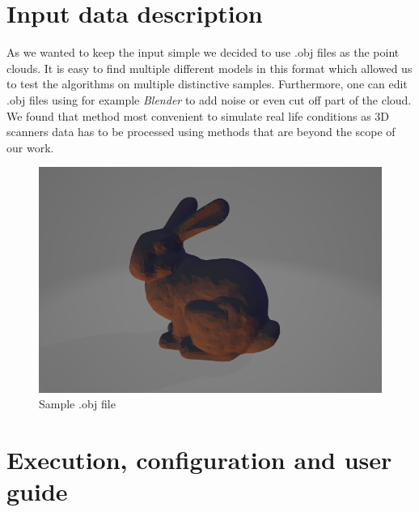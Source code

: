 \documentclass[titlepage]{article}
\begin{document}
\section{Input data description}

As we wanted to keep the input simple we decided to use .obj files as the point clouds. It is easy to find multiple different models in this format which allowed us to test the algorithms on multiple distinctive samples. Furthermore, one can edit .obj files using for example \textit{Blender} to add noise or even cut off part of the cloud. We found that method most convenient to simulate real life conditions as 3D scanners data has to be processed using methods that are beyond the scope of our work.

\begin{figure}[H]
\includegraphics[width=\textwidth]{ms-bunny.png}
\caption{Sample .obj file}
\end{figure}

\section{Execution, configuration and user guide}
\end{document}
